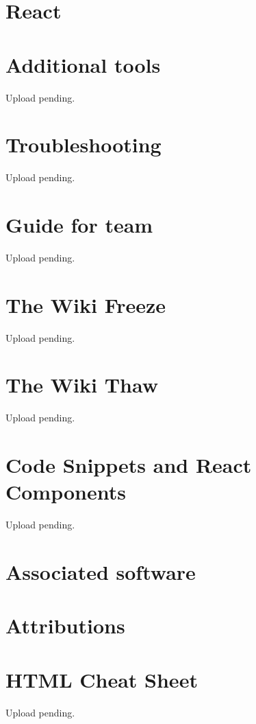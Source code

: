 \documentclass[a4paper, 11pt, twoside]{book}
\begin{document}
\chapter{React} \label{ch:react}

%
\newpage
%
\chapter{Additional tools} \label{ch:addtools}
Upload pending. %
%
\newpage
%
\chapter{Troubleshooting} \label{ch:troubleshooting}
Upload pending. %
%
\newpage
%
\chapter{Guide for team} \label{ch:guide}
Upload pending. %
%
\newpage
%
\chapter{The Wiki Freeze}  \label{ch:freeze}
Upload pending. %
%
\newpage
%
\chapter{The Wiki Thaw} \label{ch:thaw}
Upload pending. %
%
\newpage
%
\chapter{Code Snippets and React Components} \label{ch:appendix}
Upload pending. %
%
\newpage

\backmatter
{}
\pagecolor{pgcolor}

\chapter{Associated software} \label{ch:associated-software}


\chapter{Attributions} \label{ch:attributions}

%
\chapter{HTML Cheat Sheet} \label{ch:htmlcheatsheet}
Upload pending. %
%
\newpage
\end{document}
